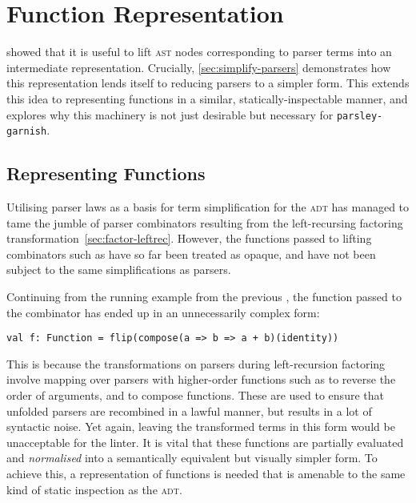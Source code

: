\documentclass[../../main.tex]{subfiles}
\begin{document}
\section{Function Representation}\label{sec:function-representation}

 showed that it is useful to lift \textsc{ast} nodes corresponding to parser terms into an intermediate  representation.
Crucially, \cref{sec:simplify-parsers} demonstrates how this representation lends itself to reducing parsers to a simpler form.
This  extends this idea to representing functions in a similar, statically-inspectable manner, and explores why this machinery is not just desirable but necessary for \texttt{parsley-garnish}.

\subsection{Representing Functions}
Utilising parser laws as a basis for term simplification for the  \textsc{adt} has managed to tame the jumble of parser combinators resulting from the left-recursing factoring transformation~\cref{sec:factor-leftrec}.
However, the functions passed to lifting combinators such as  have so far been treated as opaque, and have not been subject to the same simplifications as parsers.

Continuing from the running example from the previous , the function passed to the  combinator has ended up in an unnecessarily complex form:
\begin{verbatim}
val f: Function = flip(compose(a => b => a + b)(identity))
\end{verbatim}
%
This is because the transformations on parsers during left-recursion factoring involve mapping over parsers with higher-order functions such as  to reverse the order of arguments, and  to compose functions.
These are used to ensure that unfolded parsers are recombined in a lawful manner, but results in a lot of syntactic noise.
Yet again, leaving the transformed terms in this form would be unacceptable for the linter.
It is vital that these functions are partially evaluated and \emph{normalised} into a semantically equivalent but visually simpler form.
To achieve this, a representation of functions is needed that is amenable to the same kind of static inspection as the  \textsc{adt}.
\end{document}

